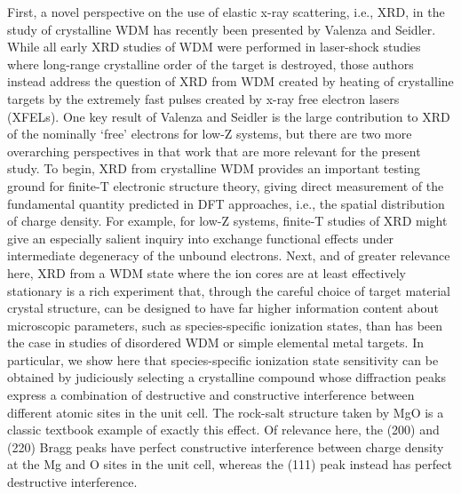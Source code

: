 First, a novel perspective on the use of elastic x-ray scattering, i.e.,
XRD, in the study of crystalline WDM has recently been presented by
Valenza and Seidler. \cite{valenza2016warm} While all early XRD studies of WDM were
performed in laser-shock studies where long-range crystalline order of
the target is destroyed, \cite{ma2013x} those authors instead address the
question of XRD from WDM created by heating of crystalline targets by
the extremely fast pulses created by x-ray free electron lasers (XFELs).
One key result of Valenza and Seidler is the large contribution to XRD
of the nominally `free' electrons for low-Z systems, but there are two
more overarching perspectives in that work that are more relevant for
the present study. To begin, XRD from crystalline WDM provides an
important testing ground for finite-T electronic structure theory,
giving direct measurement of the fundamental quantity predicted in DFT
approaches, i.e., the spatial distribution of charge density. For
example, for low-Z systems, finite-T studies of XRD might give an
especially salient inquiry into exchange functional effects under
intermediate degeneracy of the unbound electrons. \cite{karasiev2012comparison, dufty2011scaling, sjostrom2012temperature} Next, and
of greater relevance here, XRD from a WDM state where the ion cores are
at least effectively stationary is a rich experiment that, through the
careful choice of target material crystal structure, can be designed to
have far higher information content about microscopic parameters, such
as species-specific ionization states, than has been the case in studies
of disordered WDM or simple elemental metal targets. In particular, we
show here that species-specific ionization state sensitivity can be
obtained by judiciously selecting a crystalline compound whose
diffraction peaks express a combination of destructive and constructive
interference between different atomic sites in the unit cell. The
rock-salt structure taken by MgO is a classic textbook example of
exactly this effect. Of relevance here, the (200) and (220) Bragg peaks
have perfect constructive interference between charge density at the Mg
and O sites in the unit cell, whereas the (111) peak instead has perfect
destructive interference.

